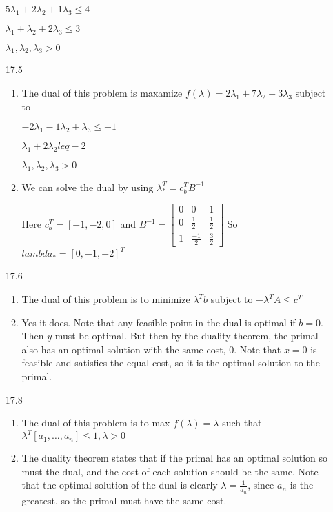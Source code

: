 \documentclass[10pt,a4paper]{article}
\newcommand\m[1]{\begin{bmatrix}#1\end{bmatrix}}
\begin{document}
\begin{enumerate}
    $5\lambda_1 + 2\lambda_2+ 1\lambda_3 \leq 4 $
    
    $\lambda_1 + \lambda_2+ 2\lambda_3 \leq 3 $

    $\lambda_1, \lambda_2, \lambda_3 > 0$

    \item [17.5] \begin{enumerate}
        \item The dual of this problem is maxamize $f(\lambda) = 2\lambda_1 + 7\lambda_2 + 3\lambda_3$ subject to

        $-2\lambda_1 - 1\lambda_2 + \lambda_3 \leq -1 $

        $\lambda_1 + 2\lambda_2 leq -2 $

        $\lambda_1, \lambda_2, \lambda_3 > 0$

        \item We can solve the dual by using $\lambda_*^T = c_b^T B^{-1}$
        
        Here $c_b^T = [-1, -2, 0]$ and $B^{-1} = \m{0 & 0 & 1 \\ 0 & \frac{1}{2} & \frac{1}{2} \\ 1 & \frac{-1}{2} & \frac{3}{2}}$
        So $ lambda_* = [0, -1, -2]^T$ 
    \end{enumerate}

    \item [17.6] \begin{enumerate}
        \item The dual of this problem is to minimize $\lambda^Tb$ subject to 
        $- \lambda^T A \leq c^T$
        \item Yes it does. Note that any feasible point in the dual is optimal if $b = 0$. Then $y$ must be optimal. But then by the duality theorem, the primal also has an optimal solution with the same cost, 0. 
        Note that $x = 0$ is feasible and satisfies the equal cost, so it is the optimal solution to the primal.

    \end{enumerate}
    
    \item [17.8] \begin{enumerate}
        \item  The dual of this problem is to max $f(\lambda) = \lambda$ such that
        $\lambda^T[a_1, \ldots, a_n] \leq 1, \lambda > 0$

        \item The duality theorem states that if the primal has an optimal solution so must the dual, and the cost of each solution should be the same. 
        Note that the optimal solution of the dual is clearly $\lambda = \frac{1}{a_n}$, since $a_n$ is the greatest, so the primal must have the same cost. 


\end{enumerate}
\end{enumerate}
\end{document}
